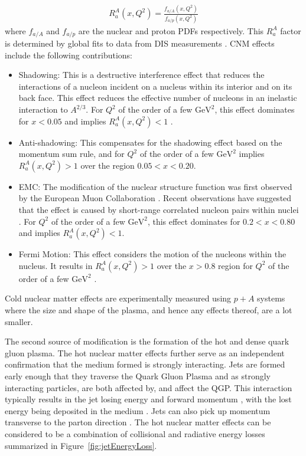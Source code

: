\begin{align}
R_a^A (x, Q^2) = \frac{f_{a/A} (x, Q^2)}{f_{a/p}(x, Q^2)}
\end{align}
where $f_{a/A}$ and $f_{a/p}$ are the nuclear and proton PDFs respectively. This $R_a^A$ factor is determined by global fits to data from DIS measurements \cite{PhysRevC.76.065207, PhysRevD.69.074028, Eskola_2009}. CNM effects include the following contributions:
\begin{itemize}
\item Shadowing: This is a destructive interference effect that reduces the interactions of a nucleon incident on a nucleus within its interior and on its back face. This effect reduces the effective number of nucleons in an inelastic interaction to $A^{2/3}$. For $Q^2$ of the order of a few $\mathrm{GeV}^2$, this effect dominates for $x < 0.05$ and implies $R_a^A (x, Q^2) < 1$  \cite{PhysRevLett.64.1342}.
\item Anti-shadowing: This compensates for the shadowing effect based on the momentum sum rule, and for $Q^2$ of the order of a few $\mathrm{GeV}^2$ implies $R_a^A (x, Q^2) > 1$ over the region $0.05 < x < 0.20$.
\item EMC: The modification of the nuclear structure function was first observed by the European Muon Collaboration \cite{AUBERT1983275}. Recent observations have suggested that the effect is caused by short-range correlated nucleon pairs within nuclei \cite{PhysRevC.85.047301}. For $Q^2$ of the order of a few $\mathrm{GeV}^2$, this effect dominates for $0.2 < x < 0.80$ and implies $R_a^A (x, Q^2) < 1$.
\item  Fermi Motion: This effect considers the motion of the nucleons within the nucleus. It results in $R_a^A (x, Q^2) > 1$  over the $x > 0.8$ region for $Q^2$ of the order of a few $\mathrm{GeV}^2$ \cite{Saito:1985ct}.
\end{itemize}

Cold nuclear matter effects are experimentally measured using $p+A$ systems where the size and shape of the plasma, and hence any effects thereof, are a lot smaller. 

The second source of modification is the formation of the hot and dense quark gluon plasma. The hot nuclear matter effects further serve as an independent confirmation that the medium formed is strongly interacting. Jets are formed early enough that they traverse the Quark Gluon Plasma and as strongly interacting particles, are both affected by, and affect the QGP. This interaction typically results in the jet losing energy and forward momentum \cite{2012176, ATLAS:2017wvp}, with the lost energy being deposited in the medium \cite{Khachatryan2016}. Jets can also pick up momentum transverse to the parton direction \cite{Chatrchyan:2012nia}. The hot nuclear matter effects can be considered to be a combination of collisional and radiative energy losses summarized in Figure~\ref{fig:jetEnergyLoss}.

